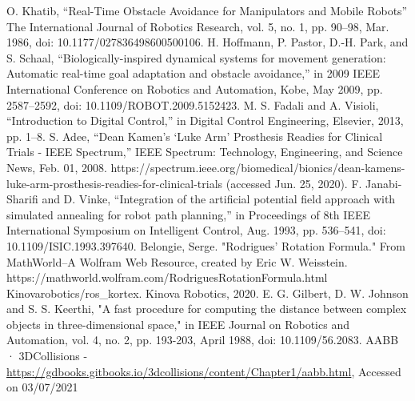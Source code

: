 \documentclass[a4paper, 11.5pt, conference]{ieeeconf}      %
\begin{document}
\begin{thebibliography}{10}
	
 O. Khatib, “Real-Time Obstacle Avoidance for Manipulators and Mobile Robots” The International Journal of Robotics Research, vol. 5, no. 1, pp. 90–98, Mar. 1986, doi: 10.1177/027836498600500106.
 H. Hoffmann, P. Pastor, D.-H. Park, and S. Schaal, “Biologically-inspired dynamical systems for movement generation: Automatic real-time goal adaptation and obstacle avoidance,” in 2009 IEEE International Conference on Robotics and Automation, Kobe, May 2009, pp. 2587–2592, doi: 10.1109/ROBOT.2009.5152423.
 M. S. Fadali and A. Visioli, “Introduction to Digital Control,” in Digital Control Engineering, Elsevier, 2013, pp. 1–8.
 S. Adee, “Dean Kamen’s ‘Luke Arm’ Prosthesis Readies for Clinical Trials - IEEE Spectrum,” IEEE Spectrum: Technology, Engineering, and Science News, Feb. 01, 2008. https://spectrum.ieee.org/biomedical/bionics/dean-kamens-luke-arm-prosthesis-readies-for-clinical-trials (accessed Jun. 25, 2020).
 F. Janabi-Sharifi and D. Vinke, “Integration of the artificial potential field approach with simulated annealing for robot path planning,” in Proceedings of 8th IEEE International Symposium on Intelligent Control, Aug. 1993, pp. 536–541, doi: 10.1109/ISIC.1993.397640.
  Belongie, Serge. "Rodrigues' Rotation Formula." From MathWorld--A Wolfram Web Resource, created by Eric W. Weisstein. https://mathworld.wolfram.com/RodriguesRotationFormula.html 
 Kinovarobotics/ros\_kortex. Kinova Robotics, 2020.
 E. G. Gilbert, D. W. Johnson and S. S. Keerthi, "A fast procedure for computing the distance between complex objects in three-dimensional space," in IEEE Journal on Robotics and Automation, vol. 4, no. 2, pp. 193-203, April 1988, doi: 10.1109/56.2083.
 AABB · 3DCollisions - \url{https://gdbooks.gitbooks.io/3dcollisions/content/Chapter1/aabb.html}, Accessed on 03/07/2021



\end{thebibliography}
\end{document}
